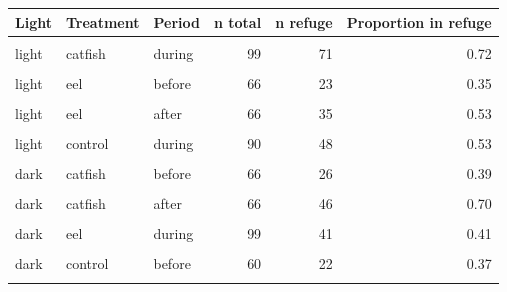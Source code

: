\documentclass[
  12pt,
  a4paper,
  oneside]{scrbook}
\begin{document}
\begin{longtable}[t]{lllrrr}
\toprule
Light & Treatment & Period & n total & n refuge & Proportion in refuge\\
\midrule
\cellcolor{gray!8}{light} & \cellcolor{gray!8}{catfish} & \cellcolor{gray!8}{before} & \cellcolor{gray!8}{66} & \cellcolor{gray!8}{34} & \cellcolor{gray!8}{0.52}\\
light & catfish & during & 99 & 71 & 0.72\\
\cellcolor{gray!8}{light} & \cellcolor{gray!8}{catfish} & \cellcolor{gray!8}{after} & \cellcolor{gray!8}{66} & \cellcolor{gray!8}{48} & \cellcolor{gray!8}{0.73}\\
light & eel & before & 66 & 23 & 0.35\\
\cellcolor{gray!8}{light} & \cellcolor{gray!8}{eel} & \cellcolor{gray!8}{during} & \cellcolor{gray!8}{99} & \cellcolor{gray!8}{49} & \cellcolor{gray!8}{0.49}\\
\addlinespace
light & eel & after & 66 & 35 & 0.53\\
\cellcolor{gray!8}{light} & \cellcolor{gray!8}{control} & \cellcolor{gray!8}{before} & \cellcolor{gray!8}{60} & \cellcolor{gray!8}{24} & \cellcolor{gray!8}{0.40}\\
light & control & during & 90 & 48 & 0.53\\
\cellcolor{gray!8}{light} & \cellcolor{gray!8}{control} & \cellcolor{gray!8}{after} & \cellcolor{gray!8}{60} & \cellcolor{gray!8}{49} & \cellcolor{gray!8}{0.82}\\
dark & catfish & before & 66 & 26 & 0.39\\
\addlinespace
\cellcolor{gray!8}{dark} & \cellcolor{gray!8}{catfish} & \cellcolor{gray!8}{during} & \cellcolor{gray!8}{99} & \cellcolor{gray!8}{47} & \cellcolor{gray!8}{0.47}\\
dark & catfish & after & 66 & 46 & 0.70\\
\cellcolor{gray!8}{dark} & \cellcolor{gray!8}{eel} & \cellcolor{gray!8}{before} & \cellcolor{gray!8}{66} & \cellcolor{gray!8}{18} & \cellcolor{gray!8}{0.27}\\
dark & eel & during & 99 & 41 & 0.41\\
\cellcolor{gray!8}{dark} & \cellcolor{gray!8}{eel} & \cellcolor{gray!8}{after} & \cellcolor{gray!8}{66} & \cellcolor{gray!8}{24} & \cellcolor{gray!8}{0.36}\\
\addlinespace
dark & control & before & 60 & 22 & 0.37\\
\cellcolor{gray!8}{dark} & \cellcolor{gray!8}{control} & \cellcolor{gray!8}{during} & \cellcolor{gray!8}{90} & \cellcolor{gray!8}{38} & \cellcolor{gray!8}{0.42}\\

\end{longtable}
\end{document}
